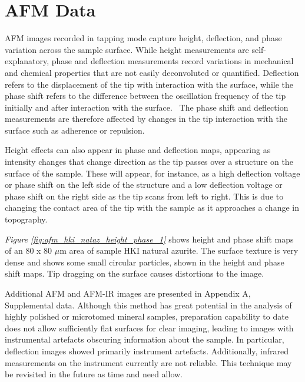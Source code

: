 \section[AFM Data]{AFM Data}
\label{section3.4}


AFM images recorded in tapping mode capture height, deflection, and phase variation across the sample surface. While height measurements are self-explanatory, phase and deflection measurements record variations in mechanical and chemical properties that are not easily deconvoluted or quantified. Deflection refers to the displacement of the tip with interaction with the surface, while the phase shift refers to the difference between the oscillation frequency of the tip initially and after interaction with the surface.~\autocite{iscpi} The phase shift and deflection measurements are therefore affected by changes in the tip interaction with the surface such as adherence or repulsion. 

Height effects can also appear in phase and deflection maps, appearing as intensity changes that change direction as the tip passes over a structure on the surface of the sample. These will appear, for instance, as a high deflection voltage or phase shift on the left side of the structure and a low deflection voltage or phase shift on the right side as the tip scans from left to right. This is due to changing the contact area of the tip with the sample as it approaches a change in topography.~\autocite{iscpi} 

\textit{Figure \ref{fig:afm_hki_nataz_height_phase_1}} shows height and phase shift maps of an 80 x 80 $\mu$m area of sample HKI natural azurite. The surface texture is very dense and shows some small circular particles, shown in the height and phase shift maps. Tip dragging on the surface causes distortions to the image. 

Additional AFM and AFM-IR images are presented in Appendix A, Supplemental data. Although this method has great potential in the analysis of highly polished or microtomed mineral samples, preparation capability to date does not allow sufficiently flat surfaces for clear imaging, leading to images with instrumental artefacts obscuring information about the sample. In particular, deflection images showed primarily instrument artefacts. Additionally, infrared measurements on the instrument currently are not reliable. This technique may be revisited in the future as time and need allow.

